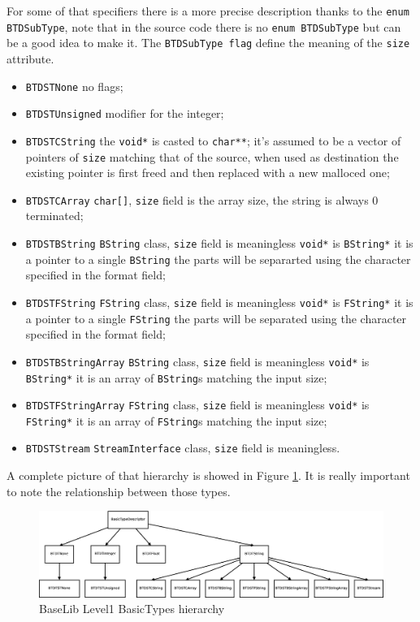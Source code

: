 For some of that specifiers there is a more precise description thanks to the \texttt{enum BTDSubType}, note that in the source code there is no \texttt{enum BTDSubType} but can be a good idea to make it. The \texttt{BTDSubType flag} define the meaning of the \texttt{size} attribute.
\begin{itemize}
 \item \texttt{BTDSTNone} no flags;
 \item \texttt{BTDSTUnsigned} modifier for the integer;
 \item \texttt{BTDSTCString} the \texttt{void*} is casted to \texttt{char**}; it's assumed to be a vector of pointers of \texttt{size} matching     that of the source, when used as destination the existing pointer is first freed and then replaced with a new malloced one;
 \item \texttt{BTDSTCArray} \texttt{char[]}, \texttt{size} field is the array size, the string is always 0 terminated;
 \item \texttt{BTDSTBString} \texttt{BString} class, \texttt{size} field is meaningless \texttt{void*} is \texttt{BString*} it is a pointer to a single \texttt{BString} the parts will be separarted using the character specified in the format field;
 \item \texttt{BTDSTFString} \texttt{FString} class, \texttt{size} field is meaningless \texttt{void*} is \texttt{FString*} it is a pointer to a single \texttt{FString} the parts will be separated using the character specified in the format field;
 \item \texttt{BTDSTBStringArray} \texttt{BString} class, \texttt{size} field is meaningless \texttt{void*} is \texttt{BString*} it is an array of \texttt{BString}s matching the input size;
 \item \texttt{BTDSTFStringArray} \texttt{FString} class, \texttt{size} field is meaningless \texttt{void*} is \texttt{FString*} it is an array of \texttt{FString}s matching the input size;
 \item \texttt{BTDSTStream} \texttt{StreamInterface} class, \texttt{size} field is meaningless.
\end{itemize}

A complete picture of that hierarchy is showed in Figure \ref{f:level1:BasicTypes}. It is really important to note the relationship between those types.
\begin{figure}[h!]
 \begin{center}
  \includegraphics[width=\textwidth]{level1/types.eps}
  \caption{BaseLib Level1 BasicTypes hierarchy}
  \label{f:level1:BasicTypes}
 \end{center}
\end{figure}

